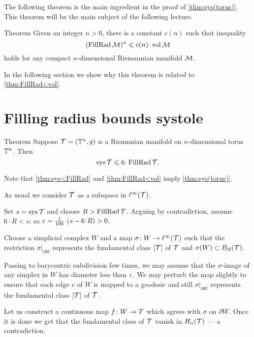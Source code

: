\medskip

The following theorem is the main ingredient in the proof of \ref{thm:sys(torus)}.
This theorem will be the main subject of the following lecture.

\begin{thm}{Theorem}\label{thm:FillRad<vol}
Given an integer $n>0$, there is a constant $c(n)$ such that inequality
\[(\FillRad \spc{M})^n\le c(n)\cdot \vol \spc{M}\]
holds for any compact $n$-dimensional Riemannian manifold $\mathcal{M}$.
\end{thm}

In the following section we show why this theorem is related to \ref{thm:FillRad<vol}.

\section{Filling radius bounds systole}

\begin{thm}{Theorem}\label{thm:sys<FillRad}
Suppose $\mathcal{T}= (\mathbb{T}^n,g)$ is a Riemnnian manifold on $n$-dimensional torus $\mathbb{T}^n$.
Then 
\[\sys\spc{T}\le 6 \cdot \FillRad \spc{T}.\]
\end{thm}

Note that \ref{thm:sys<FillRad} and \ref{thm:FillRad<vol}  imply \ref{thm:sys(torus)}.

As usual we consider $\mathcal{T}$ as a subspace in $\ell^\infty(\mathcal{T})$.

Set $s=\mathop{\rm sys}\nolimits\mathcal{T}$ and choose $R>\operatorname{\rm FillRad}\mathcal{T}$.
Arguing by contradiction, assume $6\cdot R< s$;
so $\eps=\tfrac1{100}\cdot(s-6\cdot R)>0$.

Choose a simplicial complex $W$ and a map $\sigma\colon W\to \ell^\infty(\mathcal{T})$ such that the restriction $\sigma|_{\partial W}$
represents the fundamental class $[\mathcal{T}]$ of $\mathcal{T}$
and $\sigma(W)\subset B_{R}(\mathcal{T})$.


Passing to barycentric subdivision few times, we may assume that the $\sigma$-image of any simplex in $W$ has diameter less than $\varepsilon$.
We may perturb the map slightly to ensure that each edge $e$ of $W$ is mapped to a geodesic and still $\sigma|_{\partial W}$
represents the fundamental class $[\mathcal{T}]$ of $\mathcal{T}$.

Let us construct a continuous map
$f\colon W\to  \mathcal{T}$ which agrees with $\sigma$ on $\partial W$.
Once it is done we get that the fundamental class of $\mathcal{T}$ vanish in $ H_n(\mathcal{T})$ --- a contradiction.

